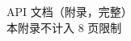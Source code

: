 \documentclass[UTF8,a4paper,10pt]{ctexart}
\begin{document}
\begin{center}
  {\Large API 文档（附录，完整）}\\
  {\small 本附录不计入 8 页限制}
\end{center}
\vspace{0.5em}

\end{document}
